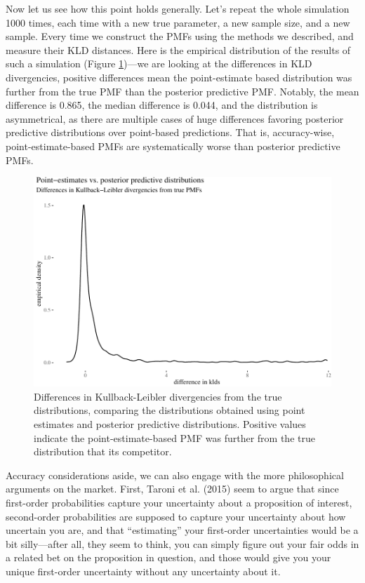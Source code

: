 \documentclass[
  10pt,
  dvipsnames,enabledeprecatedfontcommands]{scrartcl}
\begin{document}
Now let us see how this point holds generally. Let's repeat the whole
simulation 1000 times, each time with a new true parameter, a new sample
size, and a new sample. Every time we construct the PMFs using the
methods we described, and measure their KLD distances. Here is the
empirical distribution of the results of such a simulation (Figure
\ref{fig:kldsPlots})---we are looking at the differences in KLD
divergencies, positive differences mean the point-estimate based
distribution was further from the true PMF than the posterior predictive
PMF. Notably, the mean difference is 0.865, the median difference is
0.044, and the distribution is asymmetrical, as there are multiple cases
of huge differences favoring posterior predictive distributions over
point-based predictions. That is, accuracy-wise, point-estimate-based
PMFs are systematically worse than posterior predictive PMFs.

\begin{figure}[H]

\begin{center}\includegraphics[width=0.9\linewidth]{chapter-outline_files/figure-latex/fig:kldsPlots-1} \end{center}
\caption{Differences in Kullback-Leibler divergencies from the true distributions, comparing the distributions obtained using point estimates and posterior predictive distributions. Positive values indicate the point-estimate-based PMF was further from the true distribution that its competitor.}
\label{fig:kldsPlots}
\end{figure}

Accuracy considerations aside, we can also engage with the more
philosophical arguments on the market. First, Taroni et al. (2015) seem
to argue that since first-order probabilities capture your uncertainty
about a proposition of interest, second-order probabilities are supposed
to capture your uncertainty about how uncertain you are, and that
``estimating'' your first-order uncertainties would be a bit
silly---after all, they seem to think, you can simply figure out your
fair odds in a related bet on the proposition in question, and those
would give you your unique first-order uncertainty without any
uncertainty about it.
\end{document}
